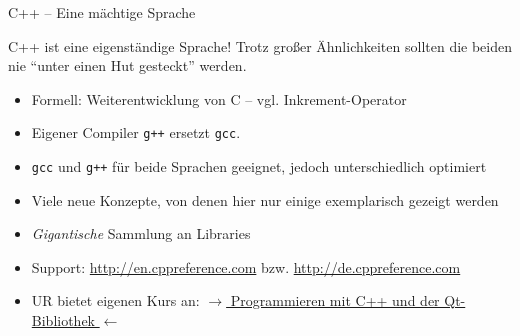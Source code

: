 
\begin{frame}{C++ -- Eine mächtige Sprache}
%
\begin{warnbox}
C++ ist eine eigenständige Sprache! Trotz großer Ähnlichkeiten sollten die beiden nie \enquote{unter einen Hut gesteckt} werden.
\end{warnbox}
%
\begin{itemize}
\item Formell: Weiterentwicklung von C -- vgl. Inkrement-Operator
\item Eigener Compiler \texttt{g++} ersetzt \texttt{gcc}.
\item \texttt{gcc} und \texttt{g++} für beide Sprachen geeignet, jedoch unterschiedlich optimiert
\item Viele neue Konzepte, von denen hier nur einige exemplarisch gezeigt werden
\item \emph{Gigantische} Sammlung an Libraries
\item Support: \url{http://en.cppreference.com} bzw. \url{http://de.cppreference.com}
\item UR bietet eigenen Kurs an:
	\href{http://www.physik.uni-regensburg.de/studium/it/c++kurs/}
	{$\rightarrow$ Programmieren mit C++ und der Qt-Bibliothek $\leftarrow$}
\end{itemize}
%
\end{frame}


